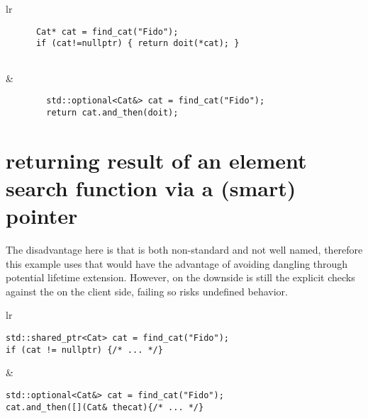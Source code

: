 \documentclass[a4paper,10pt,oneside,openany,final,article]{memoir}
\begin{document}
\begin{tabular}{ lr }
  \begin{minipage}[t]{0.45\columnwidth}
    \begin{verbatim}
      Cat* cat = find_cat("Fido");
      if (cat!=nullptr) { return doit(*cat); }


    \end{verbatim}
  \end{minipage}
  &
    \begin{minipage}[t]{0.45\columnwidth}
      \begin{verbatim}
        std::optional<Cat&> cat = find_cat("Fido");
        return cat.and_then(doit);

      \end{verbatim}
    \end{minipage}
\end{tabular}

\section{returning result of an element search function via a (smart) pointer}

The disadvantage here is that  is both non-standard and not well named, therefore this example uses  that would have the advantage of avoiding dangling through potential lifetime extension.
However, on the downside is still the explicit checks against the  on the client side, failing so risks undefined behavior.

  \begin{tabular}{ lr }
  \begin{minipage}[t]{0.45\columnwidth}
    \begin{verbatim}
std::shared_ptr<Cat> cat = find_cat("Fido");
if (cat != nullptr) {/* ... */}

    \end{verbatim}
  \end{minipage}
  &
    \begin{minipage}[t]{0.45\columnwidth}
      \begin{verbatim}
std::optional<Cat&> cat = find_cat("Fido");
cat.and_then([](Cat& thecat){/* ... */}

      \end{verbatim}
    \end{minipage}
  \end{tabular}
\end{document}

